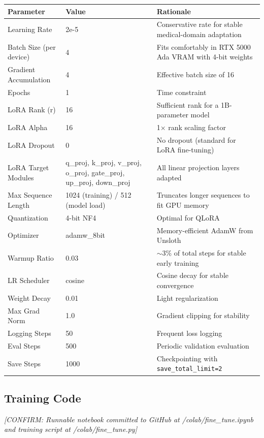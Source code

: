 \documentclass[11pt,a4paper]{article}
\begin{document}
\begin{longtable}{@{}p{4.2cm}p{2.8cm}p{6cm}@{}}
\toprule
\textbf{Parameter} & \textbf{Value} & \textbf{Rationale} \\
\midrule
\endhead
Learning Rate & 2e-5 & Conservative rate for stable medical-domain adaptation \\
Batch Size (per device) & 4 & Fits comfortably in RTX 5000 Ada VRAM with 4-bit weights \\
Gradient Accumulation & 4 & Effective batch size of 16 \\
Epochs & 1 & Time constraint \\
LoRA Rank (r) & 16 & Sufficient rank for a 1B-parameter model \\
LoRA Alpha & 16 & 1$\times$ rank scaling factor \\
LoRA Dropout & 0 & No dropout (standard for LoRA fine-tuning) \\
LoRA Target Modules & q\_proj, k\_proj, v\_proj, o\_proj, gate\_proj, up\_proj, down\_proj & All linear projection layers adapted \\
Max Sequence Length & 1024 (training) / 512 (model load) & Truncates longer sequences to fit GPU memory \\
Quantization & 4-bit NF4 & Optimal for QLoRA \\
Optimizer & adamw\_8bit & Memory-efficient AdamW from Unsloth \\
Warmup Ratio & 0.03 & $\sim$3\% of total steps for stable early training \\
LR Scheduler & cosine & Cosine decay for stable convergence \\
Weight Decay & 0.01 & Light regularization \\
Max Grad Norm & 1.0 & Gradient clipping for stability \\
Logging Steps & 50 & Frequent loss logging \\
Eval Steps & 500 & Periodic validation evaluation \\
Save Steps & 1000 & Checkpointing with \texttt{save\_total\_limit=2} \\
\bottomrule
\end{longtable}

\subsection{Training Code}

\textit{[CONFIRM: Runnable notebook committed to GitHub at /colab/fine\_tune.ipynb and training script at /colab/fine\_tune.py]}
\end{document}
